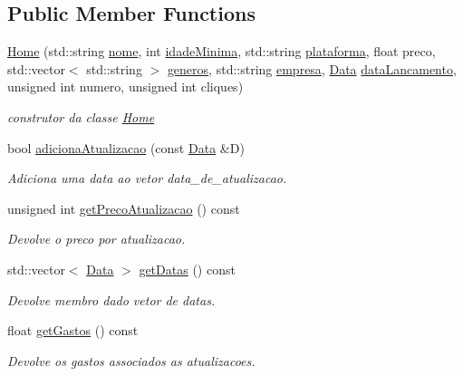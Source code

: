 \subsection*{Public Member Functions}
\begin{DoxyCompactItemize}
\item 
\hyperlink{classHome_aea37c4a72119815e8e0a83b63f345cc9}{Home} (std\+::string \hyperlink{classTitulo_a8abdf1fc6d4fc14be20bbec247664d83}{nome}, int \hyperlink{classTitulo_a28891078f53fc3317de60ae739514955}{idade\+Minima}, std\+::string \hyperlink{classTitulo_a67761eb7f006453ab0869e4b7c0a9c0b}{plataforma}, float preco, std\+::vector$<$ std\+::string $>$ \hyperlink{classTitulo_a3209265c8534416978ee9891b96c14b2}{generos}, std\+::string \hyperlink{classTitulo_a91510c440dc8583d60d88ea02f4eb1b6}{empresa}, \hyperlink{classData}{Data} \hyperlink{classTitulo_ae540ddf2c607eb0e4de29eb8c0cca7f0}{data\+Lancamento}, unsigned int numero, unsigned int cliques)
\begin{DoxyCompactList}\small\item\em construtor da classe \hyperlink{classHome}{Home} \end{DoxyCompactList}\item 
bool \hyperlink{classHome_a94aec68b520d98ac38c6794b5771cd53}{adiciona\+Atualizacao} (const \hyperlink{classData}{Data} \&D)
\begin{DoxyCompactList}\small\item\em Adiciona uma data ao vetor data\+\_\+de\+\_\+atualizacao. \end{DoxyCompactList}\item 
unsigned int \hyperlink{classHome_a52f37198fb17a321dbcac93d1c35b537}{get\+Preco\+Atualizacao} () const
\begin{DoxyCompactList}\small\item\em Devolve o preco por atualizacao. \end{DoxyCompactList}\item 
std\+::vector$<$ \hyperlink{classData}{Data} $>$ \hyperlink{classHome_a0ab7279a76525f48cb1b64b8bae98a44}{get\+Datas} () const
\begin{DoxyCompactList}\small\item\em Devolve membro dado vetor de datas. \end{DoxyCompactList}\item 
float \hyperlink{classHome_aff6d69739d404378524a591596b47856}{get\+Gastos} () const
\begin{DoxyCompactList}\small\item\em Devolve os gastos associados as atualizacoes. \end{DoxyCompactList}\end{DoxyCompactItemize}
